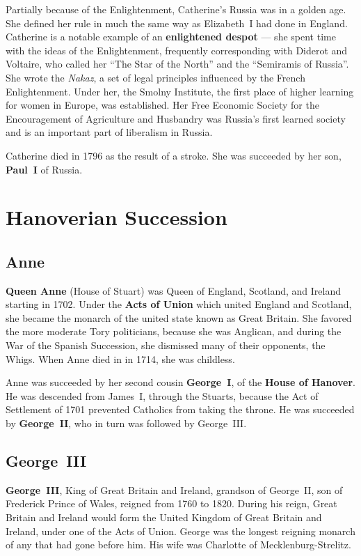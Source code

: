 Partially because of the Enlightenment, Catherine's Russia was in a golden age.
She defined her rule in much the same way as Elizabeth~I had done in England.
Catherine is a notable example of an \textbf{enlightened despot} ---
she spent time with the ideas of the Enlightenment, frequently corresponding with Diderot and Voltaire,
who called her ``The Star of the North'' and the ``Semiramis of Russia''.
She wrote the \textit{Nakaz}, a set of legal principles influenced by the French Enlightenment.
Under her, the Smolny Institute, the first place of higher learning for women in Europe, was established.
Her Free Economic Society for the Encouragement of Agriculture and Husbandry
was Russia's first learned society and is an important part of liberalism in Russia.

Catherine died in 1796 as the result of a stroke.
She was succeeded by her son, \textbf{Paul~I} of Russia.

\section{Hanoverian Succession}

\subsection*{Anne}

\textbf{Queen Anne} (House of Stuart) was Queen of England, Scotland, and Ireland starting in 1702.
Under the \textbf{Acts of Union} which united England and Scotland,
she became the monarch of the united state known as Great Britain.
She favored the more moderate Tory politicians, because she was Anglican,
and during the War of the Spanish Succession, she dismissed many of their opponents, the Whigs.
When Anne died in in 1714, she was childless.

Anne was succeeded by her second cousin \textbf{George~I}, of the \textbf{House of Hanover}.
He was descended from James~I, through the Stuarts,
because the Act of Settlement of 1701 prevented Catholics from taking the throne.
He was succeeded by \textbf{George~II}, who in turn was followed by George~III\@.

\subsection*{George~III}

\textbf{George~III}, King of Great Britain and Ireland, grandson of George~II, son of Frederick Prince of Wales,
reigned from 1760 to 1820.
During his reign, Great Britain and Ireland would form the United Kingdom of Great Britain and Ireland,
under one of the Acts of Union.
George was the longest reigning monarch of any that had gone before him.
His wife was Charlotte of Mecklenburg-Strelitz.


